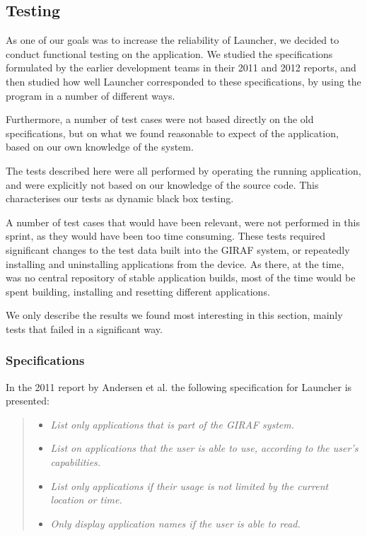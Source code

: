 \subsection{Testing}\label{sec:testing_sprint1}

As one of our goals was to increase the reliability of Launcher, we decided to conduct functional testing on the application.
We studied the specifications formulated by the earlier development teams in their 2011 \cite{launcher2011} and 2012 \cite{launcher2012} reports, and then studied how well Launcher corresponded to these specifications, by using the program in a number of different ways. 

Furthermore, a number of test cases were not based directly on the old specifications, but on what we found reasonable to expect of the application, based on our own knowledge of the system.

The tests described here were all performed by operating the running application, and were explicitly not based on our knowledge of the source code. 
This characterises our tests as dynamic black box testing. 

A number of test cases that would have been relevant, were not performed in this sprint, as they would have been too time consuming. 
These tests required significant changes to the test data built into the GIRAF system, or repeatedly installing and uninstalling applications from the device.
As there, at the time, was no central repository of stable application builds, most of the time would be spent building, installing and resetting different applications.

We only describe the results we found most interesting in this section, mainly tests that failed in a significant way. 

\subsubsection{Specifications}
In the 2011 report by Andersen et al. \cite{launcher2011} the following specification for Launcher is presented:
\begin{quote}
\begin{itemize}
	\item \textit{List only applications that is part of the GIRAF system.}
	\item \textit{List on applications that the user is able to use, according to the user's capabilities.}
	\item \textit{List only applications if their usage is not limited by the current location or time.}
	\item \textit{Only display application names if the user is able to read.}
\end{itemize}
\end{quote}

